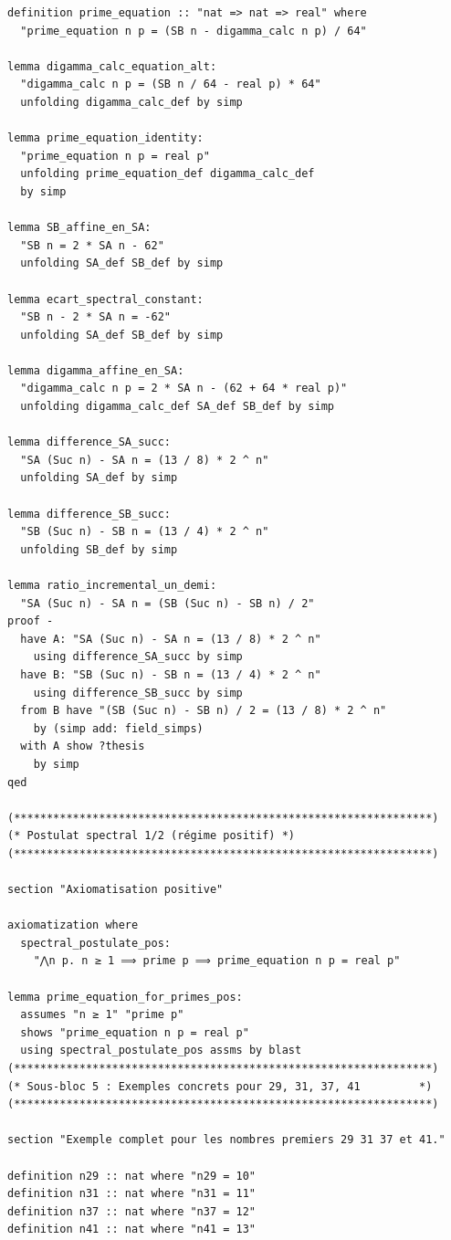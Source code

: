 \documentclass[a4paper,11pt]{article}
\begin{document}
\begin{holcode}[title={\textcolor{white}{File: methode\_spectral.thy -- Part 1/4}}]
\begin{lstlisting}
definition prime_equation :: "nat => nat => real" where
  "prime_equation n p = (SB n - digamma_calc n p) / 64"

lemma digamma_calc_equation_alt:
  "digamma_calc n p = (SB n / 64 - real p) * 64"
  unfolding digamma_calc_def by simp

lemma prime_equation_identity:
  "prime_equation n p = real p"
  unfolding prime_equation_def digamma_calc_def
  by simp

lemma SB_affine_en_SA:
  "SB n = 2 * SA n - 62"
  unfolding SA_def SB_def by simp

lemma ecart_spectral_constant:
  "SB n - 2 * SA n = -62"
  unfolding SA_def SB_def by simp

lemma digamma_affine_en_SA:
  "digamma_calc n p = 2 * SA n - (62 + 64 * real p)"
  unfolding digamma_calc_def SA_def SB_def by simp

lemma difference_SA_succ:
  "SA (Suc n) - SA n = (13 / 8) * 2 ^ n"
  unfolding SA_def by simp

lemma difference_SB_succ:
  "SB (Suc n) - SB n = (13 / 4) * 2 ^ n"
  unfolding SB_def by simp

lemma ratio_incremental_un_demi:
  "SA (Suc n) - SA n = (SB (Suc n) - SB n) / 2"
proof -
  have A: "SA (Suc n) - SA n = (13 / 8) * 2 ^ n"
    using difference_SA_succ by simp
  have B: "SB (Suc n) - SB n = (13 / 4) * 2 ^ n"
    using difference_SB_succ by simp
  from B have "(SB (Suc n) - SB n) / 2 = (13 / 8) * 2 ^ n"
    by (simp add: field_simps)
  with A show ?thesis
    by simp
qed

(****************************************************************)
(* Postulat spectral 1/2 (régime positif) *)
(****************************************************************)

section "Axiomatisation positive"

axiomatization where
  spectral_postulate_pos:
    "⋀n p. n ≥ 1 ⟹ prime p ⟹ prime_equation n p = real p"

lemma prime_equation_for_primes_pos:
  assumes "n ≥ 1" "prime p"
  shows "prime_equation n p = real p"
  using spectral_postulate_pos assms by blast
(****************************************************************)
(* Sous-bloc 5 : Exemples concrets pour 29, 31, 37, 41         *)
(****************************************************************)

section "Exemple complet pour les nombres premiers 29 31 37 et 41."

definition n29 :: nat where "n29 = 10"
definition n31 :: nat where "n31 = 11"
definition n37 :: nat where "n37 = 12"
definition n41 :: nat where "n41 = 13"


\end{lstlisting}
\end{holcode}
\end{document}
